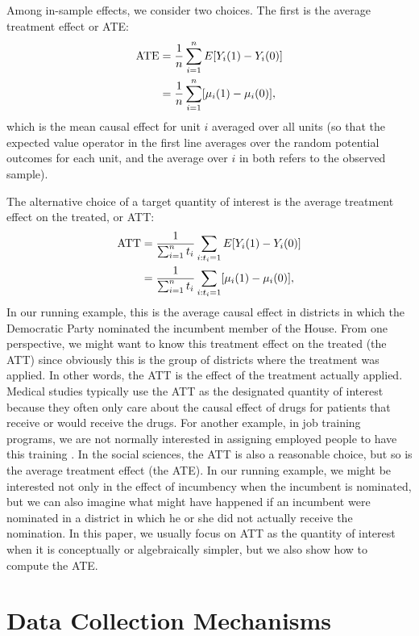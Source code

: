 \documentclass[11pt,titlepage]{article}
\begin{document}
Among in-sample effects, we consider two choices.  The first is the
average treatment effect or ATE:
\begin{align}
  \label{pate}
  \text{ATE} & = \frac{1}{n}\sum_{i=1}^n E[Y_i(1) - Y_i(0)] \notag\\
  &  = \frac{1}{n}\sum_{i=1}^n[\mu_i(1) - \mu_i(0)],
\end{align}
which is the mean causal effect for unit $i$ averaged over all units
(so that the expected value operator in the first line averages over
the random potential outcomes for each unit, and the average over $i$
in both refers to the observed sample).

The alternative choice of a target quantity of interest is the average
treatment effect on the treated, or ATT:
\begin{align}
  \label{att}
  \text{ATT} & = \frac{1}{\sum_{i=1}^n t_i}\sum_{i:t_i=1} E[Y_i(1) - Y_i(0)]\notag\\
  & = \frac{1}{\sum_{i=1}^n t_i}\sum_{i:t_i=1}[\mu_i(1) - \mu_i(0)],
\end{align}
In our running example, this is the average causal effect in districts
in which the Democratic Party nominated the incumbent member of the
House.  From one perspective, we might want to know this treatment
effect on the treated (the ATT) since obviously this is the group of
districts where the treatment was applied.  In other words, the ATT is
the effect of the treatment actually applied.  Medical studies
typically use the ATT as the designated quantity of interest because
they often only care about the causal effect of drugs for patients
that receive or would receive the drugs.  For another example, in job
training programs, we are not normally interested in assigning
employed people to have this training \citep{HecIchTod98}.  In the
social sciences, the ATT is also a reasonable choice, but so is the
average treatment effect (the ATE).  In our running example, we might
be interested not only in the effect of incumbency when the incumbent
is nominated, but we can also imagine what might have happened if an
incumbent were nominated in a district in which he or she did not
actually receive the nomination.  In this paper, we usually focus on
ATT as the quantity of interest when it is conceptually or
algebraically simpler, but we also show how to compute the ATE.

\section{Data Collection Mechanisms}
\end{document}
